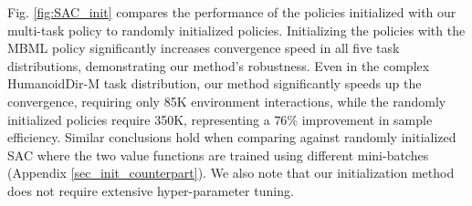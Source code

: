 Fig. \ref{fig:SAC_init} compares the performance of the policies initialized with our multi-task policy to randomly initialized policies.
Initializing the policies with the MBML policy significantly increases convergence speed in all five task distributions, demonstrating our method's robustness.
Even in the complex HumanoidDir-M task distribution, our method significantly speeds up the convergence, requiring only 85K environment interactions, while the randomly initialized policies require 350K, representing a $76\%$ improvement in sample efficiency.
Similar conclusions hold when comparing against randomly initialized SAC where the two value functions are trained using different mini-batches (Appendix \ref{sec_init_counterpart}).
We also note that our initialization method does not require extensive hyper-parameter tuning.


